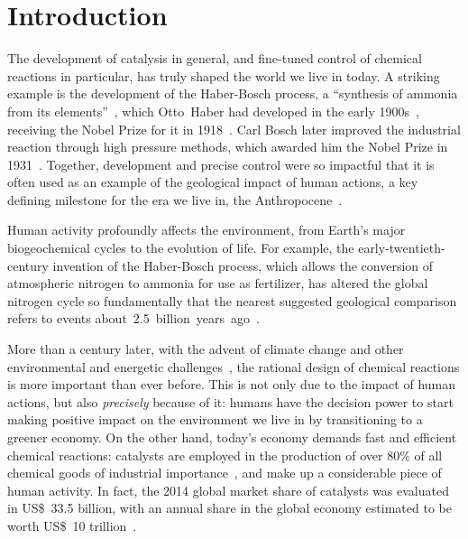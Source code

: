 \chapter*{Introduction}%
\label{ch:introduction}

The development of catalysis in general, and fine-tuned control of chemical reactions in particular,
has truly shaped the world we live in today.
A striking example is the development of the Haber-Bosch process,
a ``synthesis of ammonia from its elements''~\cite{Nobel_1918},
which Otto~Haber had developed in the early 1900s~\cite{Erisman_2008,Lewis_2015},
receiving the Nobel Prize for it in 1918~\cite{Nobel_1918}.
Carl Bosch later improved the industrial reaction through high pressure methods,
which awarded him the Nobel Prize in 1931~\cite{Nobel_1931}.
Together, development and precise control were so impactful that it is often used
as an example of the geological impact of human actions, a key defining milestone for
the era we live in, the Anthropocene~\cite{Smil_1999,Canfield_2010,Lewis_2015}.
%
\begin{citacao}
	Human activity profoundly affects the environment,
	from Earth’s major biogeochemical cycles to the evolution of life.
	For example, the early-twentieth-century invention of the Haber-Bosch process,
	which allows the conversion of atmospheric nitrogen to ammonia for use as fertilizer,
	has altered the global nitrogen cycle so fundamentally
	that the nearest suggested geological comparison refers to events
	about~2.5~billion~years~ago~\cite{Lewis_2015}.
\end{citacao}

More than a century later,
with the advent of climate change and other environmental and energetic challenges~\cite{Bertozzi_2016},
the rational design of chemical reactions is more important than ever before.
This is not only due to the impact of human actions,
but also \emph{precisely} because of it:
humans have the decision power to start making positive impact on the environment we live in
by transitioning to a greener economy.
On the other hand, today's economy demands fast and efficient chemical reactions:
catalysts are employed in the production of over 80\% of all chemical
goods of industrial
importance~\cite{Breakthrough_Catalyst,GlobalCatalystMarket},
and make up a considerable piece of human activity.
In fact, the 2014 global market share of catalysts was evaluated in US\$~33.5 billion,
with an annual share in the global economy estimated to be worth US\$~10
trillion~\cite{GlobalCatalystMarket}.


